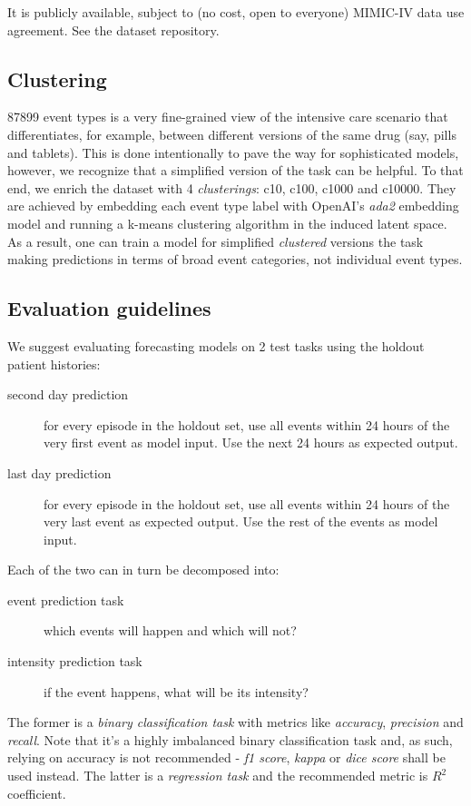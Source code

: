 It is publicly available, subject to (no cost, open to everyone) MIMIC-IV data use agreement.
See the dataset repository.

\subsection{Clustering}

87899 event types is a very fine-grained view of the intensive care scenario that differentiates, for example, between different versions of the same drug (say, pills and tablets).
This is done intentionally to pave the way for sophisticated models, however, we recognize that a simplified version of the task can be helpful.
To that end, we enrich the dataset with 4 \emph{clusterings}: c10, c100, c1000 and c10000.
They are achieved by embedding each event type label with OpenAI's \emph{ada2} embedding model and running a k-means clustering algorithm in the induced latent space.
As a result, one can train a model for simplified \emph{clustered} versions the task making predictions in terms of broad event categories, not individual event types.

\subsection{Evaluation guidelines}

We suggest evaluating forecasting models on 2 test tasks using the holdout patient histories:
\begin{description}
    \item[second day prediction] for every episode in the holdout set, use all events within 24 hours of the very first event as model input. Use the next 24 hours as expected output.
    \item[last day prediction] for every episode in the holdout set, use all events within 24 hours of the very last event as expected output. Use the rest of the events as model input. 
\end{description}

Each of the two can in turn be decomposed into:
\begin{description}
    \item[event prediction task] which events will happen and which will not?
    \item[intensity prediction task] if the event happens, what will be its intensity?
\end{description}

The former is a \emph{binary classification task} with metrics like \emph{accuracy}, \emph{precision} and \emph{recall}.
Note that it's a highly imbalanced binary classification task and, as such, relying on accuracy is not recommended - \emph{f1 score}, \emph{kappa} or \emph{dice score} shall be used instead.
The latter is a \emph{regression task} and the recommended metric is $R^2$ coefficient.

